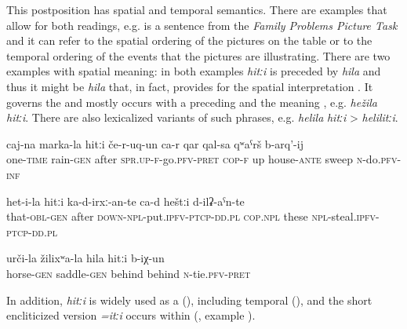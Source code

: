 This postposition has spatial and temporal semantics. There are examples that allow for both readings, e.g.  is a sentence from the \textit{Family Problems Picture Task} \citep{SanRoqueEtAl2012} and it can refer to the spatial ordering of the pictures on the table or to the temporal ordering of the events that the pictures are illustrating. There are two examples with spatial meaning: in both examples \textit{hitːi} is preceded by \textit{hila} and thus it might be \textit{hila} that, in fact, provides for the spatial interpretation . It governs the  and mostly occurs with a preceding  and the meaning , e.g. \textit{hežila} \textit{hitːi}. There are also lexicalized variants of such phrases, e.g. \textit{helila} \textit{hitːi} > \textit{helilitːi}.
%
\begin{exe}
	\ex
	\begin{xlist}
		\ex	\label{Once after the rain (she) went up to sweep in front of the house}
		\gll	caj-na	marka-la	hitːi	če-r-uq-un ca-r	qar	qal-sa	qʷaˁrš	b-arq'-ij  \\
			one-\textsc{time}	rain-\textsc{gen}	after	\textsc{spr.up}-\textsc{f}-go.\textsc{pfv}-\textsc{pret} \textsc{cop-f}	up	house-\textsc{ante}	sweep	\textsc{n}-do.\textsc{pfv}-\textsc{inf}\\
		\glt	{}

		\ex	\label{After this (one) must put these, these where they steal}
		\gll	het-i-la	hitːi	ka-d-irxː-an-te ca-d	heštːi	d-ilʡ-aˁn-te \\
			that-\textsc{obl}-\textsc{gen}	after	\textsc{down-npl}-put.\textsc{ipfv}-\textsc{ptcp}-\textsc{dd}.\textsc{pl} \textsc{cop.npl}	these	\textsc{npl}-steal.\textsc{ipfv}-\textsc{ptcp}-\textsc{dd}.\textsc{pl}\\
		\glt	{}

		\ex	\label{He tied it behind the saddle}
		\gll	urči-la	žilixʷa-la	hila	hitːi	b-iχ-un  \\
			horse-\textsc{gen}	saddle-\textsc{gen}	behind	behind	\textsc{n}-tie.\textsc{pfv}-\textsc{pret}\\
		\glt	{}
	\end{xlist}
\end{exe}

In addition, \textit{hitːi} is widely used as a  (), including temporal  (), and the short encliticized version \textit{=itːi} occurs within  (, example ).


